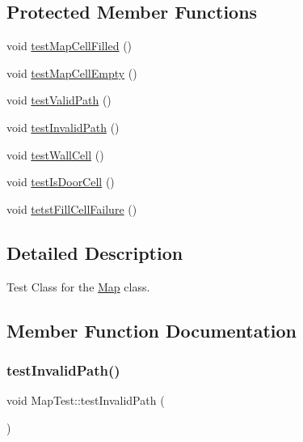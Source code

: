 \subsection*{Protected Member Functions}
\begin{DoxyCompactItemize}
\item 
void \hyperlink{classMapTest_a07e1aa96435351d15809b880ff7a7efb}{test\+Map\+Cell\+Filled} ()
\item 
void \hyperlink{classMapTest_a83bb3473f74089996c7f6bee8d59a97c}{test\+Map\+Cell\+Empty} ()
\item 
void \hyperlink{classMapTest_ae7a28d196c97101aa248a326af2a3f5b}{test\+Valid\+Path} ()
\item 
void \hyperlink{classMapTest_ad8823027d386c8d25f378d02adad120d}{test\+Invalid\+Path} ()
\item 
void \hyperlink{classMapTest_a577057c71af12efac9f1d6878bf85d01}{test\+Wall\+Cell} ()
\item 
void \hyperlink{classMapTest_a87e123f3f250492e1c444f0a3c8338b5}{test\+Is\+Door\+Cell} ()
\item 
void \hyperlink{classMapTest_a3e9eca91fbec359042f7287d378a3534}{tetst\+Fill\+Cell\+Failure} ()
\end{DoxyCompactItemize}


\subsection{Detailed Description}
Test Class for the \hyperlink{classMap}{Map} class. 

\subsection{Member Function Documentation}
\hypertarget{classMapTest_ad8823027d386c8d25f378d02adad120d}{}\label{classMapTest_ad8823027d386c8d25f378d02adad120d} 
\subsubsection{\texorpdfstring{test\+Invalid\+Path()}{testInvalidPath()}}
{\footnotesize\ttfamily void Map\+Test\+::test\+Invalid\+Path (\begin{DoxyParamCaption}{ }\end{DoxyParamCaption})\hspace{0.3cm}{\ttfamily [protected]}}

